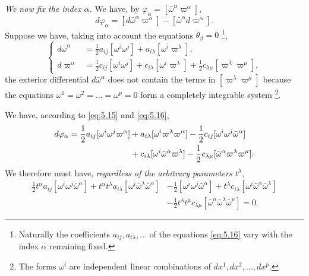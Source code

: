 \documentclass[leqno,11pt]{book}
\numberwithin{equation}{chapter}
\theoremstyle{shape1}
\theoremstyle{shape0}
\theoremstyle{shape2}
\theoremstyle{definition}
\begin{document}
\emph{We now fix the index $\alpha$.} We have, by $\varphi_{\alpha}=[\bar\omega^{\alpha}\varpi^{\alpha}]$,
\begin{equation}
  \label{eq:5.15}
  d\varphi_{\alpha}=[d\bar\omega^{\alpha}\varpi^{\alpha}]-[\bar\omega^{\alpha}d\varpi^{\alpha}].
\end{equation}
Suppose we have, taking into account the equations $\theta_{\beta}=0$ \footnote{Naturally the coefficients $a_{ij},a_{i\lambda},\dots$ of the equations \eqref{eq:5.16} vary with the index $\alpha$ remaining fixed.},
\begin{equation}
  \label{eq:5.16}
  \left\{
    \begin{aligned}
      d\bar\omega^{\alpha}&=\frac{1}{2}a_{ij}[\omega^{i}\omega^{j}]+a_{i\lambda}[\omega^{i}\varpi^{\lambda}],\\
      d\varpi^{\alpha}&=\frac{1}{2}c_{ij}[\omega^{i}\omega^{j}]+c_{i\lambda}[\omega^{i}\varpi^{\lambda}]+\frac{1}{2}c_{\lambda\mu}[\varpi^{\lambda}\varpi^{\mu}],
    \end{aligned}
  \right.
\end{equation}
the exterior differential $d\bar\omega^{\alpha}$ does not contain the terms in $[\varpi^{\lambda}\varpi^{\mu}]$ because the equations $\omega^{1}=\omega^{2}=\dots=\omega^{p}=0$ form a completely integrable system \footnote{The forms $\omega^{i}$ are independent linear combinations of $dx^{1},dx^{2},\dots,dx^{p}$.}.

We have, according to \eqref{eq:5.15} and \eqref{eq:5.16},
\begin{align}
  \label{eq:5.17}
  d\varphi_{\alpha}=\frac{1}{2}a_{ij}[\omega^{i}\omega^{j}\varpi^{\alpha}]&+a_{i\lambda}[\omega^{i}\varpi^{\lambda}\varpi^{\alpha}]-\frac{1}{2}c_{ij}[\omega^{i}\omega^{j}\bar\omega^{\alpha}]\\
  &+c_{i\lambda}[\omega^{i}\bar\omega^{\alpha}\varpi^{\lambda}]-\frac{1}{2}c_{\lambda\mu}[\bar\omega^{\alpha}\varpi^{\lambda}\varpi^{\mu}].\notag
\end{align}
We therefore must have, \emph{regardless of the arbitrary parameters $t^{\lambda}$},
\begin{align*}
  \frac{1}{2}t^{\alpha}a_{ij}[\omega^{i}\omega^{j}\bar\omega^{\alpha}]+t^{\alpha}t^{\lambda}a_{i\lambda}[\omega^{i}\bar\omega^{\lambda}\bar\omega^{\alpha}]&-\frac{1}{2}[\omega^{i}\omega^{j}\bar\omega^{\alpha}]+t^{\lambda}c_{i\lambda}[\omega^{i}\bar\omega^{\alpha}\bar\omega^{\lambda}]\\
&-\frac{1}{2}t^{\lambda}t^{\mu}c_{\lambda\mu}[\bar\omega^{\alpha}\bar\omega^{\lambda}\bar\omega^{\mu}]=0.
\end{align*}
\end{document}
